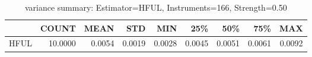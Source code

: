 \begin{table}[ht]
\centering
\caption{variance summary: Estimator=HFUL, Instruments=166, Strength=0.50}
\begin{tabular}{lrrrrrrrr}
\toprule
 & COUNT & MEAN & STD & MIN & 25\% & 50\% & 75\% & MAX \\
\midrule
HFUL & 10.0000 & 0.0054 & 0.0019 & 0.0028 & 0.0045 & 0.0051 & 0.0061 & 0.0092 \\
\bottomrule
\end{tabular}
\end{table}
